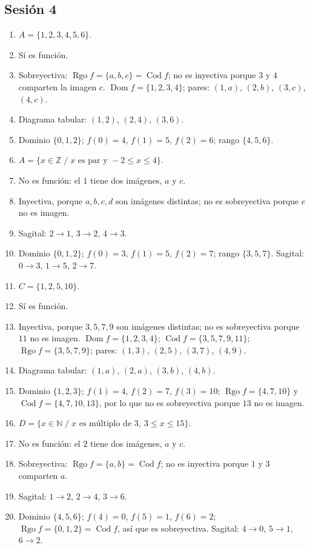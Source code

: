 \documentclass[12pt, letterpaper]{article}
\newcommand{\N}{\mathbb{N}}
\newcommand{\Z}{\mathbb{Z}}
\begin{document}
\subsection*{Sesión 4}
\begin{enumerate}[leftmargin=*, label=\textbf{\arabic*.}]
  \item $A=\{1,2,3,4,5,6\}$.
  \item Sí es función.
  \item Sobreyectiva: $\operatorname{Rgo} f=\{a,b,c\}=\operatorname{Cod} f$; no es inyectiva porque $3$ y $4$ comparten la imagen $c$. $\operatorname{Dom} f=\{1,2,3,4\}$; pares: $(1,a)$, $(2,b)$, $(3,c)$, $(4,c)$.
  \item Diagrama tabular: $(1,2)$, $(2,4)$, $(3,6)$.
  \item Dominio $\{0,1,2\}$; $f(0)=4$, $f(1)=5$, $f(2)=6$; rango $\{4,5,6\}$.
  \item $A=\{x\in\Z \;/\; x \text{ es par y } -2\le x\le 4\}$.
  \item No es función: el $1$ tiene dos imágenes, $a$ y $c$.
  \item Inyectiva, porque $a,b,c,d$ son imágenes distintas; no es sobreyectiva porque $e$ no es imagen.
  \item Sagital: $2\to1$, $3\to2$, $4\to3$.
  \item Dominio $\{0,1,2\}$; $f(0)=3$, $f(1)=5$, $f(2)=7$; rango $\{3,5,7\}$. Sagital: $0\to3$, $1\to5$, $2\to7$.
  \item $C=\{1,2,5,10\}$.
  \item Sí es función.
  \item Inyectiva, porque $3,5,7,9$ son imágenes distintas; no es sobreyectiva porque $11$ no es imagen. $\operatorname{Dom} f=\{1,2,3,4\}$; $\operatorname{Cod} f=\{3,5,7,9,11\}$; $\operatorname{Rgo} f=\{3,5,7,9\}$; pares: $(1,3)$, $(2,5)$, $(3,7)$, $(4,9)$.
  \item Diagrama tabular: $(1,a)$, $(2,a)$, $(3,b)$, $(4,b)$.
  \item Dominio $\{1,2,3\}$; $f(1)=4$, $f(2)=7$, $f(3)=10$; $\operatorname{Rgo} f=\{4,7,10\}$ y $\operatorname{Cod} f=\{4,7,10,13\}$, por lo que no es sobreyectiva porque $13$ no es imagen.
  \item $D=\{x\in\N \;/\; x \text{ es múltiplo de } 3,\ 3\le x\le 15\}$.
  \item No es función: el $2$ tiene dos imágenes, $a$ y $c$.
  \item Sobreyectiva: $\operatorname{Rgo} f=\{a,b\}=\operatorname{Cod} f$; no es inyectiva porque $1$ y $3$ comparten $a$.
  \item Sagital: $1\to2$, $2\to4$, $3\to6$.
  \item Dominio $\{4,5,6\}$; $f(4)=0$, $f(5)=1$, $f(6)=2$; $\operatorname{Rgo} f=\{0,1,2\}=\operatorname{Cod} f$, así que es sobreyectiva. Sagital: $4\to0$, $5\to1$, $6\to2$.
\end{enumerate}
\end{document}
